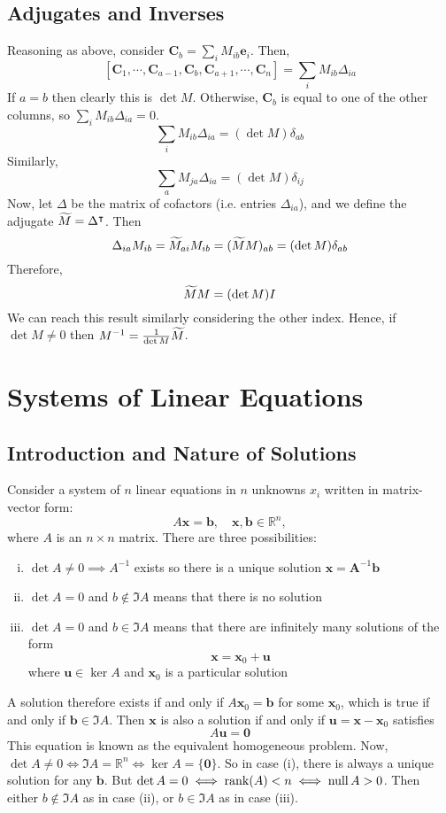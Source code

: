 \documentclass{article}
\begin{document}
	\subsection{Adjugates and Inverses}
	Reasoning as above, consider $\bm C_b = \sum_i M_{ib} \bm e_i$. Then,
	\[ [\bm C_1, \cdots, \bm C_{a-1}, \bm C_b, \bm C_{a+1}, \cdots, \bm C_n ] = \sum_i M_{ib} \Delta_{ia} \]
	If $a=b$ then clearly this is $\det M$. Otherwise, $\bm C_b$ is equal to one of the other columns, so $\sum_i M_{ib} \Delta_{ia} = 0$.
	\[ \sum_i M_{ib} \Delta_{ia} = (\det M)\delta_{ab} \]
	Similarly,
	\[ \sum_a M_{ja} \Delta_{ia} = (\det M)\delta_{ij} \]
	Now, let $\Delta$ be the matrix of cofactors (i.e. entries $\Delta_{ia}$), and we define the adjugate $\widetilde{M} = \Delta^\intercal$. Then
	\[ \Delta_{ia}M_{ib} = \widetilde{M}_{ai}M_{ib} = (\widetilde{M} M)_{ab} = (\det M)\delta_{ab} \]
	Therefore,
	\[ \widetilde{M} M = (\det M) I \]
	We can reach this result similarly considering the other index. Hence, if $\det M \neq 0$ then $M^{-1} = \frac{1}{\det M}\widetilde{M}$.

	\section{Systems of Linear Equations}
	\subsection{Introduction and Nature of Solutions}
	Consider a system of $n$ linear equations in $n$ unknowns $x_i$ written in matrix-vector form:
	\[ A\bm x = \bm b,\quad \bm x, \bm b \in \mathbb R^n, \]
	where $A$ is an $n \times n$ matrix. There are three possibilities:
	\begin{enumerate}[(i)]
		\item $\det A \neq 0 \implies A^{-1}$ exists so there is a unique solution $\bm x = \bm A^{-1} \bm b$
		\item $\det A = 0$ and $b \notin \Im A$ means that there is no solution
		\item $\det A = 0$ and $b \in \Im A$ means that there are infinitely many solutions of the form
		\[ \bm x = \bm x_0 + \bm u \]
		where $\bm u \in \ker A$ and $\bm x_0$ is a particular solution
	\end{enumerate}
	A solution therefore exists if and only if $A\bm x_0 = \bm b$ for some $\bm x_0$, which is true if and only if $\bm b \in \Im A$. Then $\bm x$ is also a solution if and only if $\bm u = \bm x - \bm x_0$ satisfies
	\[ A\bm u = \bm 0 \]
	This equation is known as the equivalent homogeneous problem. Now, $\det A \neq 0 \iff \Im A = \mathbb R^n \iff \ker A = \{ \bm 0 \}$. So in case (i), there is always a unique solution for any $\bm b$. But $\det A = 0 \iff \rank(A) < n \iff \operatorname{null} A > 0$. Then either $b \notin \Im A$ as in case (ii), or $b \in \Im A$ as in case (iii).
	
\end{document}

